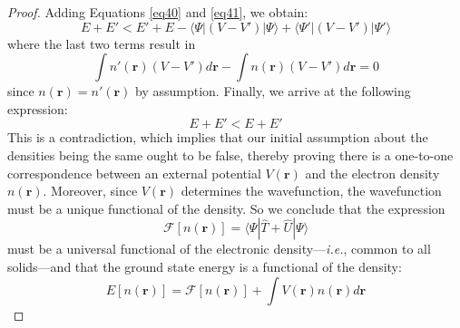 \begin{proof}
  Adding Equations \ref{eq40} and \ref{eq41}, we obtain:
  \begin{equation}
    \label{eq42}
    E + E' < E' + E - \langle \Psi|(V - V')|\Psi\rangle + \langle \Psi'|(V - V')|\Psi'\rangle
  \end{equation}
  where the last two terms result in 
  \begin{equation}
    \label{eq43}
    \int n'(\mathbf{r}) (V - V') d\mathbf{r} - \int n(\mathbf{r}) (V - V') d\mathbf{r} = 0
  \end{equation}
  since $n(\mathbf{r})=n'(\mathbf{r})$ by assumption. Finally, we arrive at the following expression: 
  \begin{equation}
    \label{eq44}
    E + E' < E + E'
  \end{equation}
  This is a contradiction, which implies that our initial assumption about the densities being the same ought to be false, thereby proving there is a one-to-one correspondence between an external potential $V(\mathbf{r})$ and the electron density $n(\mathbf{r})$. Moreover, since $V(\mathbf{r})$ determines the wavefunction, the wavefunction must be a unique functional of the density. So we conclude that the expression  
  \begin{equation}
    \label{eq45}
    \mathcal{F}[n(\mathbf{r})] = \langle \Psi |\hat{T} + \hat{U} |\Psi \rangle 
  \end{equation}
  must be a universal functional of the electronic density---\emph{i.e.}, common to all solids---and that the ground state energy is a functional of the density: 
  \begin{equation}
    \label{eq46}
    E[n(\mathbf{r})] = \mathcal{F}[n(\mathbf{r})] + \int V(\mathbf{r}) n(\mathbf{r}) d\mathbf{r}
  \end{equation}
\end{proof}

